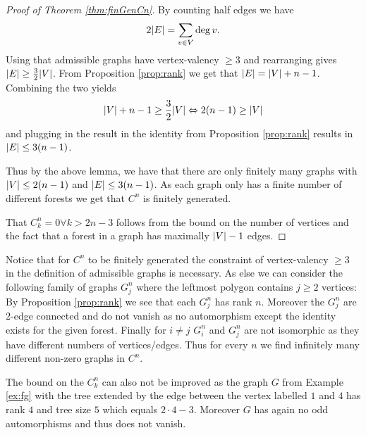 \begin{proof}[Proof of Theorem \ref{thm:finGenCn}]
	By counting half edges we have
	\[
		2 \abs{E} = \sum_{v \in V} \deg{v}
	.\] 
	Using that admissible graphs have vertex-valency $\geq 3$ and rearranging gives $\abs{E} \geq \frac{3}{2} \abs{V}$.
	From Proposition \ref{prop:rank} we get that $\abs{E} = \abs{V} + n-1$.
	Combining the two yields
	\[
		\abs{V} + n -1 \geq \frac{3}{2} \abs{V} \Leftrightarrow 2 (n-1) \geq \abs{V}
	\] 
	and plugging in the result in the identity from Proposition \ref{prop:rank} results in $\abs{E} \leq 3 (n-1)$.

	Thus by the above lemma, we have that there are only finitely many graphs with $\abs{V} \leq 2 (n-1)$ and $\abs{E} \leq 3(n-1)$.
	As each graph only has a finite number of different forests we get that $C^{n}$ is finitely generated.

	That $C_{k}^{n} = 0 \forall k > 2n -3$ follows from the bound on the number of vertices and the fact that a forest in a graph has maximally $\abs{V} - 1$ edges.
\end{proof}

\begin{remark}
	Notice that for $C^{n}$ to be finitely generated the constraint of vertex-valency $\geq 3$ in the definition of admissible graphs is necessary.
	As else we can consider the following family of graphs $G^{n}_{j}$ where the leftmost polygon contains $j \geq 2$ vertices:
	By Proposition \ref{prop:rank} we see that each $G^{n}_{j}$ has rank $n$.
	Moreover the  $G_{j}^{n}$ are $2$-edge connected and do not vanish as no automorphism except the identity exists for the given forest. 
	Finally for $i\neq j$ $G^{n}_{i}$ and $G^{n}_{j}$ are not isomorphic as they have different numbers of vertices/edges.
	Thus for every $n$ we find infinitely many different non-zero graphs in $C^{n}$.
\end{remark}

\begin{remark}
	The bound on the $C_{k}^{n}$ can also not be improved as the graph $G$ from Example \ref{ex:fg} with the tree extended by the edge between the vertex labelled $1$ and $4$ has rank $4$ and
	tree size $5$ which equals $2 \cdot 4 - 3$. Moreover $G$ has again no odd automorphisms and thus does not vanish.
\end{remark}

